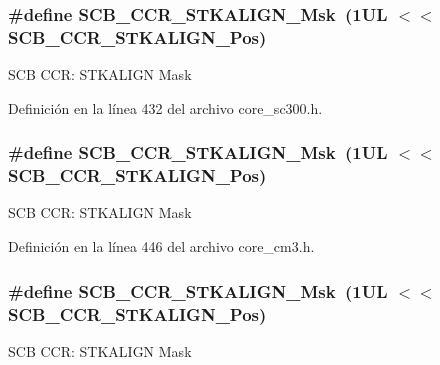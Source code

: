 \subsubsection[{\texorpdfstring{S\+C\+B\+\_\+\+C\+C\+R\+\_\+\+S\+T\+K\+A\+L\+I\+G\+N\+\_\+\+Msk}{SCB_CCR_STKALIGN_Msk}}]{\setlength{\rightskip}{0pt plus 5cm}\#define S\+C\+B\+\_\+\+C\+C\+R\+\_\+\+S\+T\+K\+A\+L\+I\+G\+N\+\_\+\+Msk~(1\+U\+L $<$$<$ S\+C\+B\+\_\+\+C\+C\+R\+\_\+\+S\+T\+K\+A\+L\+I\+G\+N\+\_\+\+Pos)}\hypertarget{group___c_m_s_i_s___s_c_b_ga33cf22d3d46af158a03aad25ddea1bcb}{}\label{group___c_m_s_i_s___s_c_b_ga33cf22d3d46af158a03aad25ddea1bcb}
S\+CB C\+CR\+: S\+T\+K\+A\+L\+I\+GN Mask 

Definición en la línea 432 del archivo core\+\_\+sc300.\+h.

\subsubsection[{\texorpdfstring{S\+C\+B\+\_\+\+C\+C\+R\+\_\+\+S\+T\+K\+A\+L\+I\+G\+N\+\_\+\+Msk}{SCB_CCR_STKALIGN_Msk}}]{\setlength{\rightskip}{0pt plus 5cm}\#define S\+C\+B\+\_\+\+C\+C\+R\+\_\+\+S\+T\+K\+A\+L\+I\+G\+N\+\_\+\+Msk~(1\+U\+L $<$$<$ S\+C\+B\+\_\+\+C\+C\+R\+\_\+\+S\+T\+K\+A\+L\+I\+G\+N\+\_\+\+Pos)}\hypertarget{group___c_m_s_i_s___s_c_b_ga33cf22d3d46af158a03aad25ddea1bcb}{}\label{group___c_m_s_i_s___s_c_b_ga33cf22d3d46af158a03aad25ddea1bcb}
S\+CB C\+CR\+: S\+T\+K\+A\+L\+I\+GN Mask 

Definición en la línea 446 del archivo core\+\_\+cm3.\+h.

\subsubsection[{\texorpdfstring{S\+C\+B\+\_\+\+C\+C\+R\+\_\+\+S\+T\+K\+A\+L\+I\+G\+N\+\_\+\+Msk}{SCB_CCR_STKALIGN_Msk}}]{\setlength{\rightskip}{0pt plus 5cm}\#define S\+C\+B\+\_\+\+C\+C\+R\+\_\+\+S\+T\+K\+A\+L\+I\+G\+N\+\_\+\+Msk~(1\+U\+L $<$$<$ S\+C\+B\+\_\+\+C\+C\+R\+\_\+\+S\+T\+K\+A\+L\+I\+G\+N\+\_\+\+Pos)}\hypertarget{group___c_m_s_i_s___s_c_b_ga33cf22d3d46af158a03aad25ddea1bcb}{}\label{group___c_m_s_i_s___s_c_b_ga33cf22d3d46af158a03aad25ddea1bcb}
S\+CB C\+CR\+: S\+T\+K\+A\+L\+I\+GN Mask 

